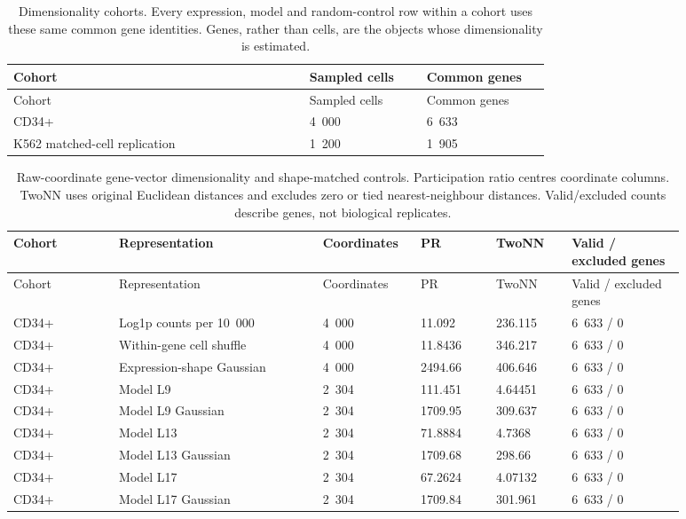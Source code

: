 \begin{longtable}{@{}L{0.48\linewidth}L{0.19\linewidth}L{0.2\linewidth}@{}}
\caption{Dimensionality cohorts. Every expression, model and random-control row within a cohort uses these same common gene identities. Genes, rather than cells, are the objects whose dimensionality is estimated.}\\
\toprule
Cohort & Sampled cells & Common genes \\
\midrule
\endfirsthead
\toprule
Cohort & Sampled cells & Common genes \\
\midrule
\endhead
\endfoot
\bottomrule
\endlastfoot
CD34+ & 4~000 & 6~633 \\
K562 matched-cell replication & 1~200 & 1~905 \\
\end{longtable}
\begin{longtable}{@{}L{0.14\linewidth}L{0.27\linewidth}L{0.12\linewidth}L{0.1\linewidth}L{0.1\linewidth}L{0.15\linewidth}@{}}
\caption{Raw-coordinate gene-vector dimensionality and shape-matched controls. Participation ratio centres coordinate columns. TwoNN uses original Euclidean distances and excludes zero or tied nearest-neighbour distances. Valid/excluded counts describe genes, not biological replicates.}\\
\toprule
Cohort & Representation & Coordinates & PR & TwoNN & Valid / excluded genes \\
\midrule
\endfirsthead
\toprule
Cohort & Representation & Coordinates & PR & TwoNN & Valid / excluded genes \\
\midrule
\endhead
\endfoot
\bottomrule
\endlastfoot
CD34+ & Log1p counts per 10~000 & 4~000 & 11.092 & 236.115 & 6~633 / 0 \\
CD34+ & Within-gene cell shuffle & 4~000 & 11.8436 & 346.217 & 6~633 / 0 \\
CD34+ & Expression-shape Gaussian & 4~000 & 2494.66 & 406.646 & 6~633 / 0 \\
CD34+ & Model L9 & 2~304 & 111.451 & 4.64451 & 6~633 / 0 \\
CD34+ & Model L9 Gaussian & 2~304 & 1709.95 & 309.637 & 6~633 / 0 \\
CD34+ & Model L13 & 2~304 & 71.8884 & 4.7368 & 6~633 / 0 \\
CD34+ & Model L13 Gaussian & 2~304 & 1709.68 & 298.66 & 6~633 / 0 \\
CD34+ & Model L17 & 2~304 & 67.2624 & 4.07132 & 6~633 / 0 \\
CD34+ & Model L17 Gaussian & 2~304 & 1709.84 & 301.961 & 6~633 / 0 \\

\end{longtable}
